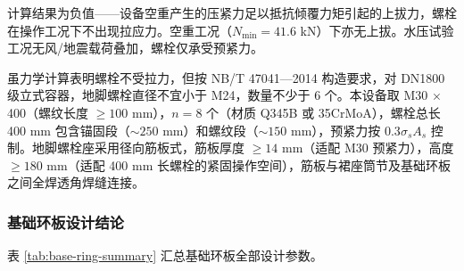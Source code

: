 计算结果为负值——设备空重产生的压紧力足以抵抗倾覆力矩引起的上拔力，螺栓在操作工况下不出现拉应力。空重工况（$N_{\min} = 41.6$ kN）下亦无上拔。水压试验工况无风/地震载荷叠加，螺栓仅承受预紧力。

虽力学计算表明螺栓不受拉力，但按 NB/T 47041—2014 构造要求，对 DN1800 级立式容器，地脚螺栓直径不宜小于 M24，数量不少于 6 个。本设备取 M30 $\times$ 400（螺纹长度 $\ge 100$ mm），$n = 8$ 个（材质 Q345B 或 35CrMoA），螺栓总长 400 mm 包含锚固段（$\sim 250$ mm）和螺纹段（$\sim 150$ mm），预紧力按 $0.3\sigma_s A_s$ 控制。地脚螺栓座采用径向筋板式，筋板厚度 $\ge 14$ mm（适配 M30 预紧力），高度 $\ge 180$ mm（适配 400 mm 长螺栓的紧固操作空间），筋板与裙座筒节及基础环板之间全焊透角焊缝连接。

\subsubsection{基础环板设计结论}
\label{sec:base-ring-conclusion}

表 \ref{tab:base-ring-summary} 汇总基础环板全部设计参数。

